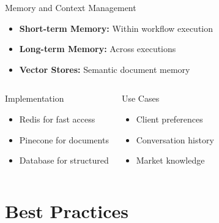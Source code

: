 \documentclass{beamer}
\begin{document}
\begin{frame}{Memory and Context Management}
  \begin{itemize}
    \item \textbf{Short-term Memory:} Within workflow execution
    \item \textbf{Long-term Memory:} Across executions
    \item \textbf{Vector Stores:} Semantic document memory
  \end{itemize}
  
  \vspace{0.3cm}
  
  \begin{columns}[onlytextwidth]
      \begin{block}{Implementation}
        \begin{itemize}
          \item Redis for fast access
          \item Pinecone for documents
          \item Database for structured
        \end{itemize}
      \end{block}
    
      \begin{block}{Use Cases}
        \begin{itemize}
          \item Client preferences
          \item Conversation history
          \item Market knowledge
        \end{itemize}
      \end{block}
  \end{columns}
\end{frame}

\section{Best Practices}
\end{document}
